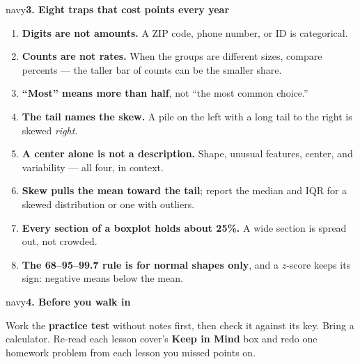 \documentclass[12pt]{article}
\newcommand{\sghead}[2][10]{%
  \vspace{0.13in}
  \boxguard[#1]
  \begin{headlinebox}{navy}\color{white}\bfseries\small #2\end{headlinebox}
  \vspace{0.09in}}
\begin{document}
\sghead{3. Eight traps that cost points every year}

\small
\begin{enumerate}[leftmargin=1.6em, itemsep=2pt]
  \item \textbf{Digits are not amounts.} A ZIP code, phone number, or ID is categorical.
  \item \textbf{Counts are not rates.} When the groups are different sizes, compare percents ---
        the taller bar of counts can be the smaller share.
  \item \textbf{``Most'' means more than half}, not ``the most common choice.''
  \item \textbf{The tail names the skew.} A pile on the left with a long tail to the right is
        skewed \emph{right}.
  \item \textbf{A center alone is not a description.} Shape, unusual features, center, and
        variability --- all four, in context.
  \item \textbf{Skew pulls the mean toward the tail}; report the median and IQR for a skewed
        distribution or one with outliers.
  \item \textbf{Every section of a boxplot holds about 25\%.} A wide section is spread out, not
        crowded.
  \item \textbf{The 68--95--99.7 rule is for normal shapes only}, and a $z$-score keeps its sign:
        negative means below the mean.
\end{enumerate}
\normalsize

\sghead[6]{4. Before you walk in}

\small
Work the \textbf{practice test} without notes first, then check it against its key. Bring a
calculator. Re-read each lesson cover's \textbf{Keep in Mind} box and redo one homework problem
from each lesson you missed points on.
\normalsize
\end{document}

